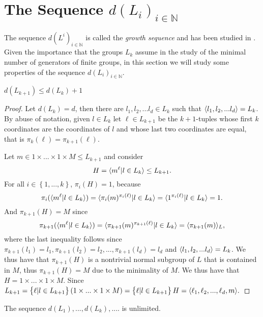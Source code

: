 \section{The Sequence \texorpdfstring{$d(L_i)_{i \in \mathbb{N}}$}{dLiN}}

The sequence $d(L^i)_{i \in \mathbb{N}}$ is called the \textit{growth sequence} and has been studied in \cite{WiegoldGSFG, WiegoldGSFGII, WiegoldGSFGIII, WiegoldGSFGIV}. Given the importance that the groups $L_k$ assume in the study of the minimal number of generators of finite groups, in this section we will study some properties of the sequence $d(L_i)_{i \in \mathbb{N}}$. 

\begin{theorem}
    $d(L_{k+1}) \le d(L_k) + 1$    
\end{theorem}
\begin{proof}
    Let $d(L_k) = d$, then there are $l_1, l_2, ... l_d \in L_k$ such that $\langle l_1, l_2, ... l_d \rangle = L_k$. By abuse of notation, given $l \in L_k$ let $\ell \in L_{k+1}$ be the $k+1$-tuples whose first $k$ coordinates are the coordinates of $l$ and whose last two coordinates are equal, that is $\pi_k(\ell) = \pi_{k+1}(\ell)$. 
        
    Let $m \in 1 \times ... \times 1 \times M \le L_{k+1}$ and consider
    $$H = \langle m^\ell | l \in L_k \rangle \le L_{k+1}.$$
    For all $i \in \left\{1, ..., k \right\}$, $\pi_i(H) = 1$, because
    $$\pi_i(\langle m^\ell | l \in L_k \rangle) = \langle \pi_i(m)^{\pi_i(\ell)} | l \in L_k \rangle = \langle 1^{\pi_i(\ell)} | l \in L_k \rangle = 1.$$ 
    And $\pi_{k+1}(H) = M$ since
    $$\pi_{k+1}(\langle m^\ell | l \in L_k \rangle) = \langle \pi_{k+1}(m)^{\pi_{k+1}(\ell)} | l \in L_k \rangle = \langle \pi_{k+1}(m) \rangle_L,$$
    where the last inequality follows since $\pi_{k+1}(l_1) = l_1, \pi_{k+1}(l_2) = l_2, ..., \pi_{k+1}(l_d) = l_d$ and $\langle l_1, l_2, ... l_d \rangle = L_k$. We thus have that $\pi_{k+1}(H)$ is a nontrivial normal subgroup of $L$ that is contained in $M$, thus $\pi_{k+1}(H) = M$ due to the minimality of $M$. We thus have that $H = 1 \times ... \times 1 \times M$.
    Since $L_{k+1} = \left\{ \ell | l \in L_{k+1} \right\}(1 \times ... \times 1 \times M) = \left\{ \ell | l \in L_{k+1} \right\} H = \langle \ell_1, \ell_2, ... , \ell_d, m \rangle.$
    
\end{proof}

\begin{theorem}
    The sequence $d(L_1),...,d(L_k), ....$ is unlimited.
\end{theorem}

